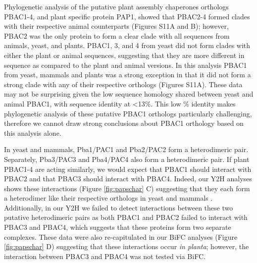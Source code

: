 Phylogenetic analysis of the putative plant assembly chaperones orthologs PBAC1-4, and plant specific protein PAP1, showed that PBAC2-4 formed clades with their respective animal counterparts (Figures S11A and B); however, PBAC2 was the only protein to form a clear clade with all sequences from animals, yeast, and plants. PBAC1, 3, and 4 from yeast did not form clades with either the plant or animal sequences, suggesting that they are more different in sequence as compared to the plant and animal versions. In this analysis PBAC1 from yeast, mammals and plants was a strong exception in that it did not form a strong clade with any of their respective orthologs (Figures S11A). These data may not be surprising given the low sequence homology shared between yeast and animal PBAC1, with sequence identity at <13\%. This low \% identity makes phylogenetic analysis of these putative PBAC1 orthologs particularly challenging, therefore we cannot draw strong conclusions about PBAC1 orthology based on this analysis alone. 

In yeast and mammals, Pba1/PAC1 and Pba2/PAC2 form a heterodimeric pair. Separately, Pba3/PAC3 and Pba4/PAC4 also form a heterodimeric pair. If plant PBAC1-4 are acting similarly, we would expect that PBAC1 should interact with PBAC2 and that PBAC3 should interact with PBAC4.  Indeed, our Y2H analyses shows these interactions (Figure \ref{fig:papschar} C) suggesting that they each form a heterodimer like their respective orthologs in yeast and mammals \citep{kunjappu14}. Additionally, in our Y2H we failed to detect interactions between these two putative heterodimeric pairs as both PBAC1 and PBAC2 failed to interact with PBAC3 and PBAC4, which suggests that these proteins form two separate complexes. These data were also re-capitulated in our BiFC analyses (Figure \ref{fig:papschar} D) suggesting that these interactions occur \textit{in planta}; however, the interaction between PBAC3 and PBAC4 was not tested via BiFC.

